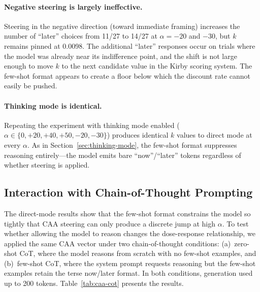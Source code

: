 \paragraph{Negative steering is largely ineffective.} Steering in the negative direction (toward immediate framing) increases the number of ``later'' choices from 11/27 to 14/27 at $\alpha = -20$ and $-30$, but $k$ remains pinned at 0.0098. The additional ``later'' responses occur on trials where the model was already near its indifference point, and the shift is not large enough to move $k$ to the next candidate value in the Kirby scoring system. The few-shot format appears to create a floor below which the discount rate cannot easily be pushed.

\paragraph{Thinking mode is identical.} Repeating the experiment with thinking mode enabled ($\alpha \in \{0, +20, +40, +50, -20, -30\}$) produces identical $k$ values to direct mode at every $\alpha$. As in Section~\ref{sec:thinking-mode}, the few-shot format suppresses reasoning entirely---the model emits bare ``now''/``later'' tokens regardless of whether steering is applied.

\subsection{Interaction with Chain-of-Thought Prompting}
\label{sec:caa-cot}

The direct-mode results show that the few-shot format constrains the model so tightly that CAA steering can only produce a discrete jump at high $\alpha$. To test whether allowing the model to reason changes the dose-response relationship, we applied the same CAA vector under two chain-of-thought conditions: (a)~zero-shot CoT, where the model reasons from scratch with no few-shot examples, and (b)~few-shot CoT, where the system prompt requests reasoning but the few-shot examples retain the terse now/later format. In both conditions, generation used up to 200 tokens. Table~\ref{tab:caa-cot} presents the results.

